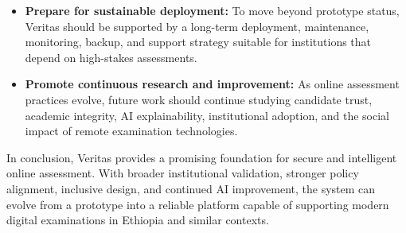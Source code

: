 \begin{itemize}
    \item \textbf{Prepare for sustainable deployment:} To move beyond prototype status, Veritas should be supported by a long-term deployment, maintenance, monitoring, backup, and support strategy suitable for institutions that depend on high-stakes assessments.

    \item \textbf{Promote continuous research and improvement:} As online assessment practices evolve, future work should continue studying candidate trust, academic integrity, AI explainability, institutional adoption, and the social impact of remote examination technologies.
\end{itemize}

In conclusion, Veritas provides a promising foundation for secure and intelligent online assessment. With broader institutional validation, stronger policy alignment, inclusive design, and continued AI improvement, the system can evolve from a prototype into a reliable platform capable of supporting modern digital examinations in Ethiopia and similar contexts.
